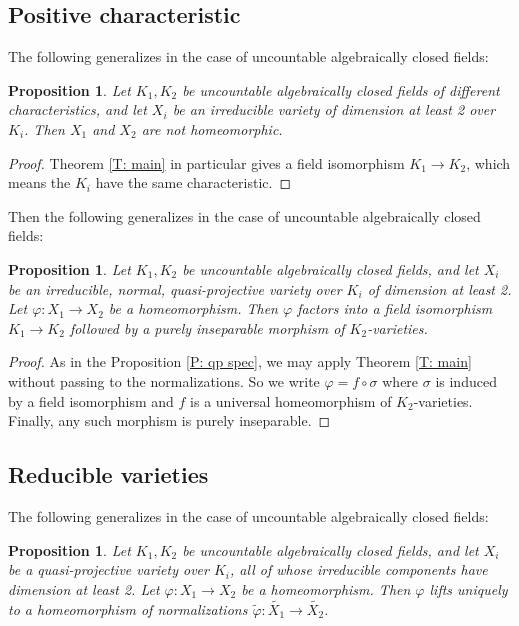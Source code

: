 \documentclass{amsart}
\newtheorem{proposition}[theorem]{Proposition}
\theoremstyle{definition}
\begin{document}
    \subsection{Positive characteristic}

    The following generalizes \cite[Speculation 2.2.12]{KLOS} in the case of uncountable algebraically closed fields:

    \begin{proposition}
        Let $K_1,K_2$ be uncountable algebraically closed fields of different characteristics, and let $X_i$ be an irreducible variety of dimension at least 2 over $K_i$. Then $X_1$ and $X_2$ are not homeomorphic.
    \end{proposition}
    \begin{proof}
        Theorem \ref{T: main} in particular gives a field isomorphism $K_1\rightarrow K_2$, which means the $K_i$ have the same characteristic. 
    \end{proof}

    Then the following generalizes \cite[Speculation 2.2.16]{KLOS} in the case of uncountable algebraically closed fields:

    \begin{proposition}
        Let $K_1,K_2$ be uncountable algebraically closed fields, and let $X_i$ be an irreducible, normal, quasi-projective variety over $K_i$ of dimension at least 2. Let $\varphi:X_1\rightarrow X_2$ be a homeomorphism. Then $\varphi$ factors into a field isomorphism $K_1\rightarrow K_2$ followed by a purely inseparable morphism of $K_2$-varieties. 
    \end{proposition}
    \begin{proof}
        As in the Proposition \ref{P: qp spec}, we may apply Theorem \ref{T: main} without passing to the normalizations. So we write $\varphi=f\circ\sigma$ where $\sigma$ is induced by a field isomorphism and $f$ is a universal homeomorphism of $K_2$-varieties. Finally, any such morphism is purely inseparable.
    \end{proof}

    \subsection{Reducible varieties}

    The following generalizes \cite[Speculation 2.2.10]{KLOS} in the case of uncountable algebraically closed fields:

    \begin{proposition}
                Let $K_1,K_2$ be uncountable algebraically closed fields, and let $X_i$ be a quasi-projective variety over $K_i$, all of whose irreducible components have dimension at least 2. Let $\varphi:X_1\rightarrow X_2$ be a homeomorphism. Then $\varphi$ lifts uniquely to a homeomorphism of normalizations $\widetilde\varphi:\widetilde{X_1}\rightarrow\widetilde{X_2}$. 
    \end{proposition}
\end{document}
